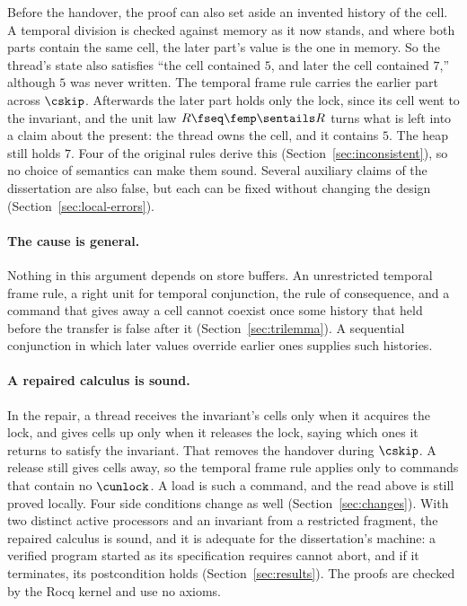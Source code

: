 Before the handover, the proof can also set aside an invented history of
the cell. A temporal division is checked against memory as it now stands,
and where both parts contain the same cell, the later part's value is the
one in memory. So the thread's state also satisfies ``the cell contained
$5$, and later the cell contained $7$,'' although $5$ was never written.
The temporal frame rule carries the earlier part across $\cskip$. Afterwards
the later part holds only the lock, since its cell went to the invariant,
and the unit law $R \fseq \femp \sentails R$ turns what is left into a
claim about the present: the thread owns the cell, and it contains $5$. The
heap still holds $7$. Four of the original rules derive this
(Section~\ref{sec:inconsistent}), so no choice of semantics can make them
sound. Several auxiliary claims of the dissertation are also false, but each
can be fixed without changing the design (Section~\ref{sec:local-errors}).

\paragraph{The cause is general.}
Nothing in this argument depends on store buffers. An unrestricted temporal
frame rule, a right unit for temporal conjunction, the rule of consequence,
and a command that gives away a cell cannot coexist once some history that
held before the transfer is false after it (Section~\ref{sec:trilemma}). A
sequential conjunction in which later values override earlier ones supplies
such histories.

\paragraph{A repaired calculus is sound.}
In the repair, a thread receives the invariant's cells only when it acquires
the lock, and gives cells up only when it releases the lock, saying which
ones it returns to satisfy the invariant. That removes the handover during
$\cskip$. A release still gives cells away, so the temporal frame rule
applies only to commands that contain no $\cunlock$. A load is such a
command, and the read above is still proved locally. Four side conditions
change as well (Section~\ref{sec:changes}). With two distinct active
processors and an invariant from a restricted fragment, the repaired
calculus is sound, and it is adequate for the dissertation's machine: a
verified program started as its specification requires cannot abort, and if
it terminates, its postcondition holds (Section~\ref{sec:results}). The
proofs are checked by the Rocq kernel and use no axioms.

